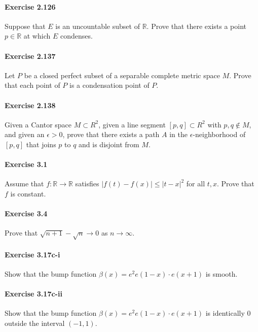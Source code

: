 \documentclass{article}
\begin{document}
\paragraph{Exercise 2.126} Suppose that $E$ is an uncountable subset of $\mathbb{R}$. Prove that there exists a point $p \in \mathbb{R}$ at which $E$ condenses.

\paragraph{Exercise 2.137} Let $P$ be a closed perfect subset of a separable complete metric space $M$. Prove that each point of $P$ is a condensation point of $P$.

\paragraph{Exercise 2.138} Given a Cantor space $M \subset R^2$, given a line segment $[p, q] \subset R^2$ with $p, q \not\in M$, and given an $\epsilon > 0$, prove that there exists a path $A$ in the $\epsilon$-neighborhood of $[p, q]$ that joins $p$ to $q$ and is disjoint from $M$.

\paragraph{Exercise 3.1} Assume that $f \colon \mathbb{R} \rightarrow \mathbb{R}$ satisfies $|f(t)-f(x)| \leq|t-x|^{2}$ for all $t, x$. Prove that $f$ is constant.

\paragraph{Exercise 3.4} Prove that $\sqrt{n+1}-\sqrt{n} \rightarrow 0$ as $n \rightarrow \infty$.

\paragraph{Exercise 3.17c-i} Show that the bump function $\beta(x)=e^{2} e(1-x) \cdot e(x+1)$ is smooth.

\paragraph{Exercise 3.17c-ii} Show that the bump function $\beta(x)=e^{2} e(1-x) \cdot e(x+1)$ is identically 0 outside the interval $(-1, 1)$.
\end{document}
